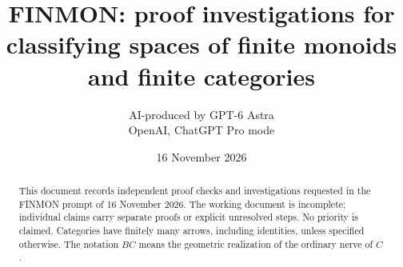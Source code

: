 \documentclass[11pt,a4paper]{article}
\title{FINMON: proof investigations for classifying spaces of finite monoids and finite categories}
\author{AI-produced by GPT-6 Astra\\OpenAI, ChatGPT Pro mode}
\date{16 November 2026}
\theoremstyle{remark}
\begin{document}
\maketitle
\begin{abstract}
This document records independent proof checks and investigations requested in the
FINMON prompt of 16 November 2026. The working document is incomplete; individual
claims carry separate proofs or explicit unresolved steps. No priority is claimed.
Categories have finitely many arrows, including identities, unless specified otherwise.
The notation $BC$ means the geometric realization of the ordinary nerve of $C$.
\end{abstract}
\tableofcontents
\clearpage
{}


\end{document}
